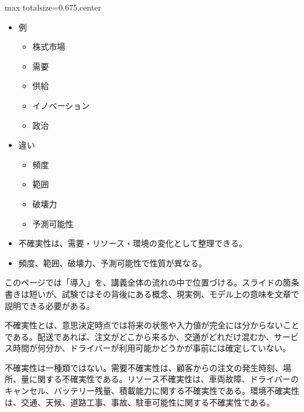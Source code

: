 \clearpage
{}
\begin{adjustbox}{max totalsize={\textwidth}{0.675\textheight},center}
\begin{minipage}{\textwidth}\scriptsize
\begin{minipage}[t]{0.485\textwidth}
\begin{itemize}
\item 例
\begin{itemize}
\item 株式市場
\item 需要
\item 供給
\item イノベーション
\item 政治
\end{itemize}
\item 違い
\begin{itemize}
\item 頻度
\item 範囲
\item 破壊力
\item 予測可能性
\end{itemize}
\end{itemize}
\begin{itemize}
\item 不確実性は、需要・リソース・環境の変化として整理できる。
\item 頻度、範囲、破壊力、予測可能性で性質が異なる。
\end{itemize}
\end{minipage}\hfill
\begin{minipage}[t]{0.485\textwidth}
このページでは「導入」を、講義全体の流れの中で位置づける。スライドの箇条書きは短いが、試験ではその背後にある概念、現実例、モデル上の意味を文章で説明できる必要がある。\par
不確実性とは、意思決定時点では将来の状態や入力値が完全には分からないことである。配送であれば、注文がどこから来るか、交通がどれだけ混むか、サービス時間が何分か、ドライバーが利用可能かどうかが事前には確定していない。\par
不確実性は一種類ではない。需要不確実性は、顧客からの注文の発生時刻、場所、量に関する不確実性である。リソース不確実性は、車両故障、ドライバーのキャンセル、バッテリー残量、積載能力に関する不確実性である。環境不確実性は、交通、天候、道路工事、事故、駐車可能性に関する不確実性である。\par

\end{minipage}
\end{minipage}
\end{adjustbox}
